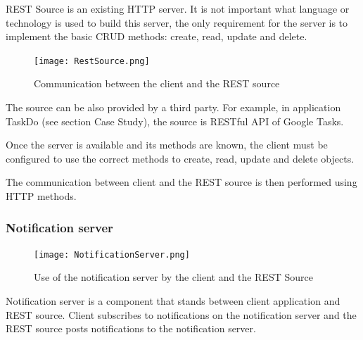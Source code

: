 REST Source is an existing HTTP server. It is not important what language or technology is used to build this server, the only requirement for the server is to implement the basic CRUD methods: create, read, update and delete.

\begin{figure}[ht!]
\centering
\texttt{[image: RestSource.png]}
\caption{Communication between the client and the REST source \label{fig:4}}
\end{figure}

The source can be also provided by a third party. For example, in application TaskDo (see section Case Study), the source is RESTful API of Google Tasks. 

Once the server is available and its methods are known, the client must be configured to use the correct methods to create, read, update and delete objects.

The communication between client and the REST source is then performed using HTTP methods.

\subsubsection{Notification server}
\label{sec:notification_server}

\begin{figure}[ht!]
\centering
\texttt{[image: NotificationServer.png]}
\caption{Use of the notification server by the client and the REST Source \label{fig:5}}
\end{figure}

Notification server is a component that stands between client application and REST source. Client subscribes to notifications on the notification server and the REST source posts notifications to the notification server. 